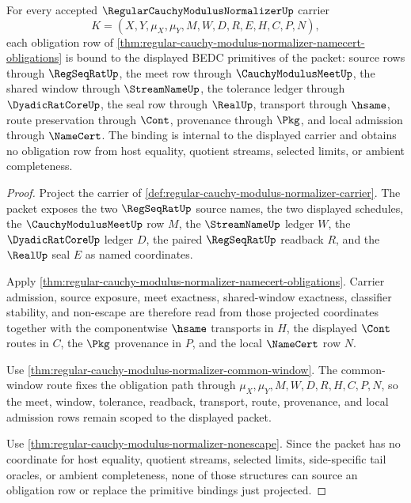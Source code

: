\begin{theorem}
\label{thm:regular-cauchy-modulus-normalizer-scoped-primitive-binding}
For every accepted $\RegularCauchyModulusNormalizerUp$ carrier
$$
K=(X,Y,\mu_X,\mu_Y,M,W,D,R,E,H,C,P,N),
$$
each obligation row of \autoref{thm:regular-cauchy-modulus-normalizer-namecert-obligations} is bound to the displayed BEDC primitives of the packet: source rows through $\RegSeqRatUp$, the meet row through $\CauchyModulusMeetUp$, the shared window through $\StreamNameUp$, the tolerance ledger through $\DyadicRatCoreUp$, the seal row through $\RealUp$, transport through $\hsame$, route preservation through $\Cont$, provenance through $\Pkg$, and local admission through $\NameCert$. The binding is internal to the displayed carrier and obtains no obligation row from host equality, quotient streams, selected limits, or ambient completeness.
\end{theorem}
\begin{proof}
Project the carrier of \autoref{def:regular-cauchy-modulus-normalizer-carrier}. The packet exposes the two $\RegSeqRatUp$ source names, the two displayed schedules, the $\CauchyModulusMeetUp$ row $M$, the $\StreamNameUp$ ledger $W$, the $\DyadicRatCoreUp$ ledger $D$, the paired $\RegSeqRatUp$ readback $R$, and the $\RealUp$ seal $E$ as named coordinates.

Apply \autoref{thm:regular-cauchy-modulus-normalizer-namecert-obligations}. Carrier admission, source exposure, meet exactness, shared-window exactness, classifier stability, and non-escape are therefore read from those projected coordinates together with the componentwise $\hsame$ transports in $H$, the displayed $\Cont$ routes in $C$, the $\Pkg$ provenance in $P$, and the local $\NameCert$ row $N$.

Use \autoref{thm:regular-cauchy-modulus-normalizer-common-window}. The common-window route fixes the obligation path through $\mu_X,\mu_Y,M,W,D,R,H,C,P,N$, so the meet, window, tolerance, readback, transport, route, provenance, and local admission rows remain scoped to the displayed packet.

Use \autoref{thm:regular-cauchy-modulus-normalizer-nonescape}. Since the packet has no coordinate for host equality, quotient streams, selected limits, side-specific tail oracles, or ambient completeness, none of those structures can source an obligation row or replace the primitive bindings just projected.
\end{proof}

